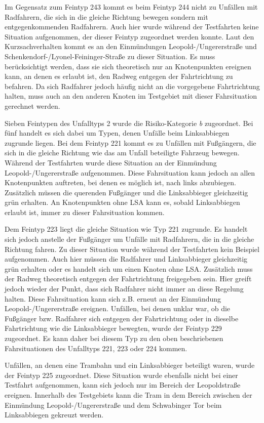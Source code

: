Im Gegensatz zum Feintyp 243 kommt es beim Feintyp 244 nicht zu Unfällen mit Radfahrern, die sich in die gleiche Richtung bewegen sondern mit entgegenkommenden Radfahrern. Auch hier wurde während der Testfahrten keine Situation aufgenommen, der dieser Feintyp zugeordnet werden konnte. Laut den Kurzsachverhalten kommt es an den Einmündungen Leopold-/Ungererstraße und Schenkendorf-/Lyonel-Feininger-Straße zu dieser Situation. Es muss berücksichtigt werden, dass sie sich theoretisch nur an Knotenpunkten ereignen kann, an denen es erlaubt ist, den Radweg entgegen der Fahrtrichtung zu befahren. Da sich Radfahrer jedoch häufig nicht an die vorgegebene Fahrtrichtung halten, muss auch an den anderen Knoten im Testgebiet mit dieser Fahrsituation gerechnet werden.

Sieben Feintypen des Unfalltyps 2 wurde die Risiko-Kategorie \textit{b} zugeordnet. Bei fünf handelt es sich dabei um Typen, denen Unfälle beim Linksabbiegen zugrunde liegen. Bei dem Feintyp 221 kommt es zu Unfällen mit Fußgängern, die sich in die gleiche Richtung wie das am Unfall beteiligte Fahrzeug bewegen. Während der Testfahrten wurde diese Situation an der Einmündung Leopold-/Ungererstraße aufgenommen. Diese Fahrsituation kann jedoch an allen Knotenpunkten auftreten, bei denen es möglich ist, nach links abzubiegen. Zusätzlich müssen die querenden Fußgänger und die Linksabbieger gleichzeitig grün erhalten. An Knotenpunkten ohne \ac{LSA} kann es, sobald Linksabbiegen erlaubt ist, immer zu dieser Fahrsituation kommen.   

Dem Feintyp 223 liegt die gleiche Situation wie Typ 221 zugrunde. Es handelt sich jedoch anstelle der Fußgänger um Unfälle mit Radfahrern, die in die gleiche Richtung fahren. Zu dieser Situation wurde während der Testfahrten kein Beispiel aufgenommen. Auch hier müssen die Radfahrer und Linksabbieger gleichzeitig grün erhalten oder es handelt sich um einen Knoten ohne \ac{LSA}. Zusätzlich muss der Radweg theoretisch entgegen der Fahrtrichtung freigegeben sein. Hier greift jedoch wieder der Punkt, dass sich Radfahrer nicht immer an diese Regelung halten. Diese Fahrsituation kann sich z.B. erneut an der Einmündung Leopold-/Ungererstraße ereignen. Unfällen, bei denen unklar war, ob die Fußgänger bzw. Radfahrer sich entgegen der Fahrtrichtung oder in dieselbe Fahrtrichtung wie die Linksabbieger bewegten, wurde der Feintyp 229 zugeordnet. Es kann daher bei diesem Typ zu den oben beschriebenen Fahrsituationen des Unfalltyps 221, 223 oder 224 kommen.

Unfällen, an denen eine Trambahn und ein Linksabbieger beteiligt waren, wurde der Feintyp 225 zugeordnet. Diese Situation wurde ebenfalls nicht bei einer Testfahrt aufgenommen, kann sich jedoch nur im Bereich der Leopoldstraße ereignen. Innerhalb des Testgebiets kann die Tram in dem Bereich zwischen der Einmündung Leopold-/Ungererstraße und dem Schwabinger Tor beim Linksabbiegen gekreuzt werden. 

